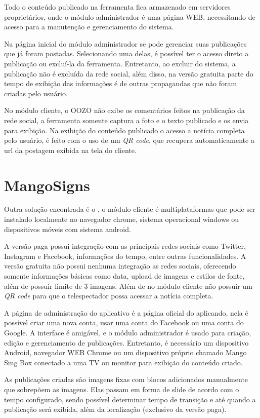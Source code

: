 Todo o conteúdo publicado na ferramenta fica armazenado em servidores proprietários, onde o módulo administrador é uma página WEB, necessitando de acesso para a manutenção e gerenciamento do sistema. 

Na página inicial do módulo administrador se pode gerenciar suas publicações que já foram postadas. Selecionando uma delas, é possível ter o acesso direto a publicação ou excluí-la da ferramenta. Entretanto, ao excluir do sistema, a publicação não é excluída da rede social, além disso, na versão gratuita parte do tempo de exibição das informações é de outras propagandas que não foram criadas pelo usuário. 

No módulo cliente, o OOZO não exibe os comentários feitos na publicação da rede social, a ferramenta somente captura a foto e o texto publicado e os envia para exibição. Na exibição do conteúdo publicado o acesso a notícia completa pelo usuário, é feito com o uso de um \textit{QR code}, que recupera automaticamente a url da postagem exibida na tela do cliente.

\section{MangoSigns}
\label{sec:mango}
Outra solução encontrada é o \cite{mango2017}, o módulo cliente é multiplataformas que pode ser instalado localmente no navegador chrome, sistema operacional windows ou dispositivos móveis com sistema android.

A versão paga possui integração com as principais redes sociais como Twitter, Instagram e Facebook, informações do tempo, entre outras funcionalidades. A versão gratuita não possui nenhuma integração as redes sociais, oferecendo somente informações básicas como data, upload de imagens e estilos de fonte, além de possuir limite de 3 imagens. Além de no módulo cliente não possuir um \textit{QR code} para que o telespectador possa acessar a notícia completa.

A página de administração do aplicativo é a página oficial do aplicando, nela é possível criar uma nova conta, usar uma conta do Facebook ou uma conta do Google. A interface é amigável, e o módulo administrador é usado para criação, edição e gerenciamento de publicações. Entretanto, é necessário um dispositivo Android, navegador WEB Chrome ou um dispositivo próprio chamado Mango Sing Box conectado a uma TV ou monitor para exibição do conteúdo criado.

As publicações criadas são imagens fixas com blocos adicionados manualmente que sobrepõem as imagens. Elas passam em forma de slide de acordo com o tempo configurado, sendo possível determinar tempo de transição e até quando a publicação será exibida, além da localização (exclusivo da versão paga). 

